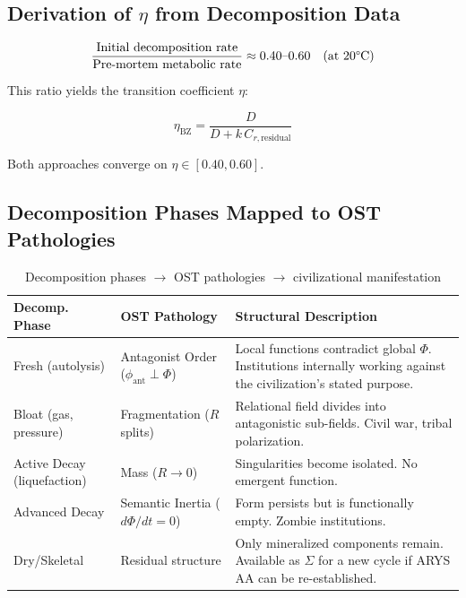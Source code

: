\documentclass[12pt,a4paper]{article}
\begin{document}
\subsection{Derivation of $\eta$ from Decomposition Data}

\begin{equation}
\frac{\text{Initial decomposition rate}}{\text{Pre-mortem metabolic rate}} \approx 0.40\text{--}0.60 \quad (\text{at 20\textdegree C})
\end{equation}

This ratio yields the transition coefficient $\eta$:

\begin{equation}\label{eq:eta_BZ}
\eta_{\mathrm{BZ}} = \frac{D}{D + k\,C_{r,\mathrm{residual}}}
\end{equation}

Both approaches converge on $\eta \in [0.40, 0.60]$.

\subsection{Decomposition Phases Mapped to OST Pathologies}

\begin{table}[H]
\centering
\caption{Decomposition phases $\to$ OST pathologies $\to$ civilizational manifestation}
\label{tab:decomp_ost}
\begin{tabular}{@{}p{2.3cm}p{3.2cm}p{6.5cm}@{}}
\toprule
\textbf{Decomp. Phase} & \textbf{OST Pathology} & \textbf{Structural Description} \\
\midrule
Fresh \newline (autolysis) & Antagonist Order \newline ($\phi_{\text{ant}} \perp \Phi$) & Local functions contradict global $\Phi$. Institutions internally working against the civilization's stated purpose. \\[0.5em]
Bloat \newline (gas, pressure) & Fragmentation \newline ($R$ splits) & Relational field divides into antagonistic sub-fields. Civil war, tribal polarization. \\[0.5em]
Active Decay \newline (liquefaction) & Mass \newline ($R \to 0$) & Singularities become isolated. No emergent function. \\[0.5em]
Advanced Decay & Semantic Inertia \newline ($d\Phi/dt = 0$) & Form persists but is functionally empty. Zombie institutions. \\[0.5em]
Dry/Skeletal & Residual structure & Only mineralized components remain. Available as $\Sigma$ for a new cycle if ARYS AA can be re-established. \\
\bottomrule
\end{tabular}
\end{table}
\end{document}
